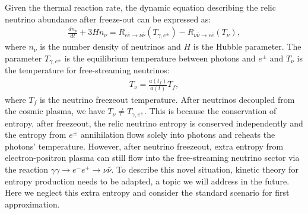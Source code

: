 Given the thermal reaction rate, the dynamic equation describing the relic neutrino abundance after freeze-out can be expressed as:
\begin{align}\label{ExtraNeutrio_eq}
\frac{dn_\nu}{dt}+3Hn_\nu=R_{e\overline{e}\to\nu\overline{\nu}}(T_{\gamma,e^\pm})-R_{\nu\overline{\nu}\to e\overline{e}}(T_\nu),
\end{align}
where $n_\nu$ is the number density of neutrinos and $H$ is the Hubble parameter. The parameter $T_{\gamma,e^\pm}$ is the equilibrium temperature between photons and $e^\pm$ and $T_\nu$ is the temperature for free-streaming neutrinos: 
\begin{align}
T_\nu=\frac{a(t_f)}{a(t)}T_f,
\end{align}
where $T_f$ is the neutrino freezeout temperature. After neutrinos decoupled from the cosmic plasma, we have $T_\nu\neq T_{\gamma,e^\pm}$. This is because
the conservation of entropy,  after freezeout, the relic neutrino entropy is conserved independently and the entropy from $e^\pm$ annihilation flows solely into photons and reheats the photons' temperature. However, after neutrino freezeout, extra entropy from electron-positron plasma can still flow into the free-streaming neutrino sector via the reaction $\gamma\gamma\to e^-e^+\to\nu\bar{\nu}$. To describe this novel situation, kinetic theory for entropy production needs to be adapted, a topic we will address in the future. Here we neglect this extra entropy and consider the standard scenario for first approximation.


